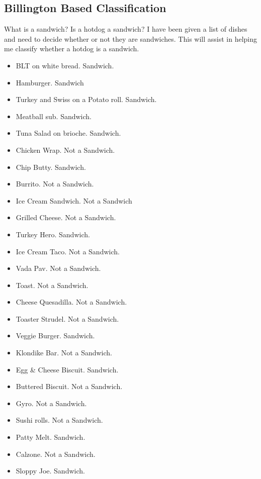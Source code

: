 \documentclass[
	letterpaper, %
]{jdf}
\begin{document}
\subsection{Billington Based Classification}
What is a sandwich? Is a hotdog a sandwich? I have been given a list of dishes and need to decide whether or not they are sandwiches. This will assist in helping me classify whether a hotdog is a sandwich.
\begin{multicols}{2}
\small
\begin{itemize}
    \item BLT on white bread. Sandwich.
    \item Hamburger. Sandwich
    \item Turkey and Swiss on a Potato roll. Sandwich.
    \item Meatball sub. Sandwich.
    \item Tuna Salad on brioche. Sandwich.
    \item Chicken Wrap. Not a Sandwich.
    \item Chip Butty. Sandwich.
    \item Burrito. Not a Sandwich.
    \item Ice Cream Sandwich. Not a Sandwich
    \item Grilled Cheese. Not a Sandwich.
    \item Turkey Hero. Sandwich.
    \item Ice Cream Taco. Not a Sandwich.
    \item Vada Pav. Not a Sandwich.
    \item Toast. Not a Sandwich.
    \item Cheese Quesadilla. Not a Sandwich.
    \item Toaster Strudel. Not a Sandwich.
    \item Veggie Burger. Sandwich.
    \item Klondike Bar. Not a Sandwich.
    \item Egg \& Cheese Biscuit. Sandwich.
    \item Buttered Biscuit. Not a Sandwich.
    \item Gyro. Not a Sandwich.
    \item Sushi rolls. Not a Sandwich.
    \item Patty Melt. Sandwich.
    \item Calzone. Not a Sandwich.
    \item Sloppy Joe. Sandwich.
\end{itemize}
\end{multicols}
\end{document}
